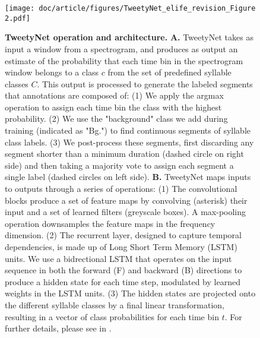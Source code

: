 \documentclass[9pt,lineno]{elife}
\begin{document}
\begin{figure}[!ht] %
\texttt{[image: doc/article/figures/TweetyNet\_elife\_revision\_Figure 2.pdf]}
\caption{{\bf TweetyNet operation and architecture.}
\textbf{A.} TweetyNet takes as input a window from a spectrogram, 
and produces as output an estimate of the probability 
that each time bin in the spectrogram window 
belongs to a class $c$ from the set of predefined syllable classes $C$.
This output is processed to generate the labeled segments that annotations are composed of: 
(1) We apply the argmax operation to assign each time bin the class with the highest probability. 
(2) We use the "background" class we add during training (indicated as "Bg.") 
to find continuous segments of syllable class labels. 
(3) We post-process these segments, 
first discarding any segment shorter than a minimum duration (dashed circle on right side) 
and then taking a majority vote to assign each segment a single label 
(dashed circles on left side). 
\textbf{B.} TweetyNet maps inputs to outputs through a series of operations: 
(1) The convolutional blocks produce a set of feature maps by convolving (asterisk) 
their input and a set of learned filters (greyscale boxes). 
A max-pooling operation downsamples the feature maps in the frequency dimension. 
(2) The recurrent layer, designed to capture temporal dependencies, 
is made up of Long Short Term Memory (LSTM) units. 
We use a bidrectional LSTM that operates on the input sequence 
in both the forward (F) and backward (B) directions 
to produce a hidden state for each time step, 
modulated by learned weights in the LSTM units. 
(3) The hidden states are projected onto the different syllable classes 
by a final linear transformation, resulting in a vector of class probabilities for each time bin $t$.
For further details, please see  in .
}
\end{figure}
\end{document}

